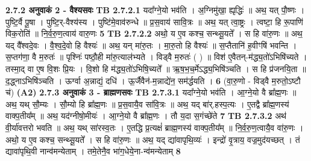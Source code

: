 \documentclass[17pt]{extarticle}
\begin{document}
{                \textbf{ 2.7.2      अनुवाकं   2 - वैश्यसवः} \newline
                                \textbf{ TB 2.7.2.1} \newline
                  यदा᳚ग्ने॒यो भव॑ति । अ॒ग्निमु॑खा॒ ह्यृद्धिः॑ ॥ अथ॒ यत् पौ॒ष्णः । पुष्टि॒र्वै पू॒षा । पुष्टि॒र्-वैश्य॑स्य । पुष्टि॑मे॒वाव॑रुन्धे ॥ प्र॒स॒वाय॑ सावि॒त्रः ॥ अथ॒ यत् त्वा॒ष्ट्रः । त्वष्टा॒ हि रू॒पाणि॑ विक॒रोति॑ ॥ नि॒र्व॒रु॒ण॒त्वाय॑ वारु॒णः \textbf{ 5} \newline
                  \newline
                                \textbf{ TB 2.7.2.2} \newline
                  अथो॒ य ए॒व कश्च॒ सन्थ्सू॒यते᳚ । स हि वा॑रु॒णः ॥ अथ॒ यद् वै᳚श्वदे॒वः । वै॒श्व॒दे॒वो हि वैश्यः॑ ॥ अथ॒ यन् मा॑रु॒तः । मा॒रु॒तो हि वैश्यः॑ ॥ स॒प्तैतानि॑ ह॒वीꣳषि॑ भवन्ति । स॒प्तग॑णा॒ वै म॒रुतः॑ ॥ पृश्निः॑ पष्ठौ॒ही मा॑रु॒त्याल॑भ्यते । विड्वै म॒रुतः॑ ( ) ॥ विश॑ ए॒वैतन्-म॑द्ध्य॒तो॑ऽभिषि॑च्यते । तस्मा॒द् वा ए॒ष वि॒शः प्रि॒यः । वि॒शो हि म॑द्ध्य॒तो॑ऽभिषि॒च्यते᳚ ॥ ऋ॒ष॒भ॒च॒र्मेऽद्ध्य॒भिषि॑ञ्चति । स हि प्र॑जनयि॒ता ॥ द॒द्ध्नाऽभिषि॑ञ्चति । ऊर्ग्वा अ॒न्नाद्यं॒ दधि॑ । ऊ॒र्जैवैन॑-म॒न्नाद्ये॑न॒ सम॑र्द्धयति । \textbf{ 6} \newline
                  \newline
                                    (वा॒रु॒णो - विड्वै म॒रुतो॒ऽष्टौ च॑) \textbf{(A2)} \newline \newline
                \textbf{ 2.7.3      अनुवाकं   3 - ब्राह्मणसवः} \newline
                                \textbf{ TB 2.7.3.1} \newline
                  यदा᳚ग्ने॒यो भव॑ति । आ॒ग्ने॒यो वै ब्रा᳚ह्म॒णः ॥ अथ॒ यथ् सौ॒म्यः । सौ॒म्यो हि ब्रा᳚ह्म॒णः ॥ प्र॒स॒वायै॒व सा॑वि॒त्रः ॥ अथ॒ यद् बा॑र्.हस्प॒त्यः । ए॒तद्वै ब्रा᳚ह्म॒णस्य॑ वाक्प॒तीय᳚म् ॥ अथ॒ यद॑ग्नीषो॒मीयः॑ । आ॒ग्ने॒यो वै ब्रा᳚ह्म॒णः । तौ य॒दा स॒गंच्छे॑ते \textbf{ 7} \newline
                  \newline
                                \textbf{ TB 2.7.3.2} \newline
                  अथ॑ वी॒र्या॑वत्तरो भवति ॥ अथ॒ यथ् सा॑रस्व॒तः । ए॒तद्धि प्र॒त्यक्षं॑ ब्राह्म॒णस्य॑ वाक्प॒तीय᳚म् ॥ नि॒र्व॒रु॒ण॒त्वायै॒व वा॑रु॒णः । अथो॒ य ए॒व कश्च॒ सन्थ्सू॒यते᳚ । स हि वा॑रु॒णः ॥ अथ॒ यद् द्या॑वापृथि॒व्यः॑ । इन्द्रो॑ वृ॒त्राय॒ वज्र॒मुद॑यच्छत् । तं द्यावा॑पृथि॒वी नान्व॑मन्येताम् । तमे॒तेनै॒व भा॑ग॒धेये॒ना-न्व॑मन्येताम् \textbf{ 8} \newline
}
\end{document}
